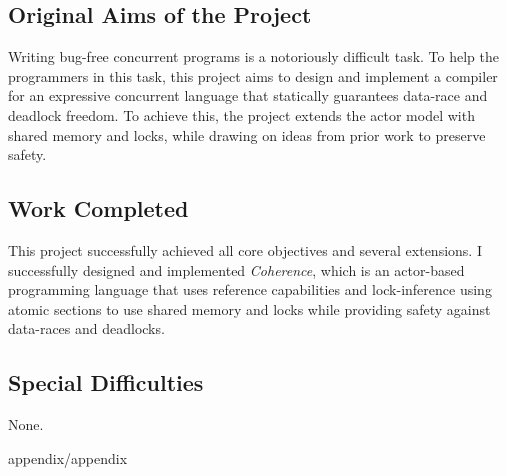 \documentclass[a4paper,12pt,fleqn]{report} %
\begin{document}
\subsection*{Original Aims of the Project}
Writing bug-free concurrent programs is a notoriously difficult task. To help the programmers in this task, this project aims to design and implement a compiler for an expressive concurrent language that statically guarantees data-race and deadlock freedom. To achieve this, the project extends the actor model with shared memory and locks, while drawing on ideas from prior work to preserve safety. 

\subsection*{Work Completed}
This project successfully achieved all core objectives and several extensions. I successfully designed and implemented \textit{Coherence}, which is an actor-based programming language that uses reference capabilities and lock-inference using atomic sections to use shared memory and locks while providing safety against data-races and deadlocks. 

\subsection*{Special Difficulties}
None. %


\tableofcontents

\newpage
{}






\printbibliography

\appendix 
 {appendix/appendix}
\end{document}
